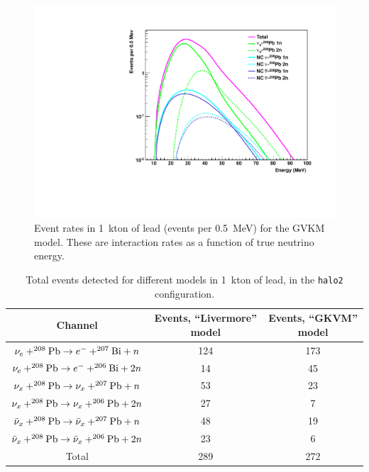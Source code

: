\documentclass[12pt]{article}
\begin{document}
\begin{figure}[htb]
  \centering\includegraphics[width=.75\textwidth]{figures/interaction_rates_gvkm_halo2.pdf}

  \caption{Event rates in 1~kton of lead (events per 0.5~MeV) for the GVKM model. These
    are interaction rates as a function of true neutrino energy.}
  \label{fig:leadrates}
\end{figure}


\begin{table}[h]
\centering
\begin{tabular}{|c|c|c|} \hline
Channel & Events, ``Livermore'' model & Events, ``GKVM'' model  \\
\hline

$\nu_e + ^{208}{\rm Pb} \rightarrow e^- + ^{207}{\rm Bi} + n$ & 124  &  173\\
$\nu_e + ^{208}{\rm Pb} \rightarrow e^- + ^{206}{\rm Bi} + 2n$ & 14   & 45 \\
$\nu_x + ^{208}{\rm Pb} \rightarrow \nu_x + ^{207}{\rm Pb} + n$ & 53  & 23 \\
$\nu_x + ^{208}{\rm Pb} \rightarrow \nu_x + ^{206}{\rm Pb} + 2n$ & 27  & 7 \\
$\bar{\nu}_x + ^{208}{\rm Pb} \rightarrow \bar{\nu}_x + ^{207}{\rm Pb} + n$ & 48  & 19 \\
$\bar{\nu}_x + ^{208}{\rm Pb} \rightarrow \bar{\nu}_x + ^{206}{\rm Pb} + 2n$ & 23 & 6 \\



\hline

Total & 289  & 272  \\ \hline
\end{tabular}
\caption{Total events detected for different models in 1~kton of lead, in the \texttt{halo2} configuration. }
\label{tab:leadtable}
\end{table}
\end{document}
